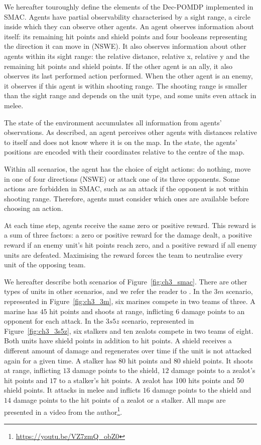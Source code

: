 We hereafter touroughly define the elements of the Dec-POMDP implemented in SMAC.
Agents have partial observability characterised by a sight range, a circle inside which they can observe other agents.
An agent observes information about itself: its remaining hit points and shield points and four booleans representing the direction it can move in (NSWE). 
It also observes information about other agents within its sight range: the relative distance, relative x, relative y and the remaining hit points and shield points. 
If the other agent is an ally, it also observes its last performed action performed.
When the other agent is an enemy, it observes if this agent is within shooting range.
The shooting range is smaller than the sight range and depends on the unit type, and some units even attack in melee.

The state of the environment accumulates all information from agents' observations.
As described, an agent perceives other agents with distances relative to itself and does not know where it is on the map.
In the state, the agents' positions are encoded with their coordinates relative to the centre of the map.

Within all scenarios, the agent has the choice of eight actions: do nothing, move in one of four directions (NSWE) or attack one of its three opponents.
Some actions are forbidden in SMAC, such as an attack if the opponent is not within shooting range.
Therefore, agents must consider which ones are available before choosing an action.

At each time step, agents receive the same zero or positive reward. 
This reward is a sum of three factors: a zero or positive reward for the damage dealt, a positive reward if an enemy unit's hit points reach zero, and a positive reward if all enemy units are defeated. 
Maximising the reward forces the team to neutralise every unit of the opposing team.

We hereafter describe both scenarios of Figure~\ref{fig:ch3_smac}.
There are other types of units in other scenarios, and we refer the reader to \citep{samvelyan2019starcraft}.
In the $3m$ scenario, represented in Figure~\ref{fig:ch3_3m}, six marines compete in two teams of three.
A marine has $45$ hit points and shoots at range, inflicting $6$ damage points to an opponent for each attack.
In the $3s5z$ scenario, represented in Figure~\ref{fig:ch3_3s5z}, six stalkers and ten zealots compete in two teams of eight.
Both units have shield points in addition to hit points.
A shield receives a different amount of damage and regenerates over time if the unit is not attacked again for a given time.
A stalker has $80$ hit points and $80$ shield points.
It shoots at range, inflicting $13$ damage points to the shield, $12$ damage points to a zealot's hit points and $17$ to a stalker's hit points.
A zealot has 100 hits points and 50 shield points.
It attacks in melee and inflicts $16$ damage points to the shield and $14$ damage points to the hit points of a zealot or a stalker.
All maps are presented in a video from the author\footnote{\url{https://youtu.be/VZ7zmQ_obZ0}}.

